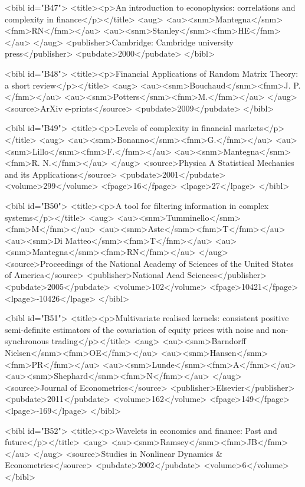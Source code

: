 \documentclass{article}
\begin{document}
{<bibl id="B47">
  <title><p>An introduction to econophysics: correlations and complexity in
  finance</p></title>
  <aug>
    <au><snm>Mantegna</snm><fnm>RN</fnm></au>
    <au><snm>Stanley</snm><fnm>HE</fnm></au>
  </aug>
  <publisher>Cambridge: Cambridge university press</publisher>
  <pubdate>2000</pubdate>
</bibl>

<bibl id="B48">
  <title><p>{Financial Applications of Random Matrix Theory: a short
  review}</p></title>
  <aug>
    <au><snm>{Bouchaud}</snm><fnm>J. P.</fnm></au>
    <au><snm>{Potters}</snm><fnm>M.</fnm></au>
  </aug>
  <source>ArXiv e-prints</source>
  <pubdate>2009</pubdate>
</bibl>

<bibl id="B49">
  <title><p>{Levels of complexity in financial markets}</p></title>
  <aug>
    <au><snm>{Bonanno}</snm><fnm>G.</fnm></au>
    <au><snm>{Lillo}</snm><fnm>F.</fnm></au>
    <au><snm>{Mantegna}</snm><fnm>R. N.</fnm></au>
  </aug>
  <source>Physica A Statistical Mechanics and its Applications</source>
  <pubdate>2001</pubdate>
  <volume>299</volume>
  <fpage>16</fpage>
  <lpage>27</lpage>
</bibl>

<bibl id="B50">
  <title><p>A tool for filtering information in complex systems</p></title>
  <aug>
    <au><snm>Tumminello</snm><fnm>M</fnm></au>
    <au><snm>Aste</snm><fnm>T</fnm></au>
    <au><snm>Di Matteo</snm><fnm>T</fnm></au>
    <au><snm>Mantegna</snm><fnm>RN</fnm></au>
  </aug>
  <source>Proceedings of the National Academy of Sciences of the United States
  of America</source>
  <publisher>National Acad Sciences</publisher>
  <pubdate>2005</pubdate>
  <volume>102</volume>
  <fpage>10421</fpage>
  <lpage>-10426</lpage>
</bibl>

<bibl id="B51">
  <title><p>Multivariate realised kernels: consistent positive semi-definite
  estimators of the covariation of equity prices with noise and non-synchronous
  trading</p></title>
  <aug>
    <au><snm>Barndorff Nielsen</snm><fnm>OE</fnm></au>
    <au><snm>Hansen</snm><fnm>PR</fnm></au>
    <au><snm>Lunde</snm><fnm>A</fnm></au>
    <au><snm>Shephard</snm><fnm>N</fnm></au>
  </aug>
  <source>Journal of Econometrics</source>
  <publisher>Elsevier</publisher>
  <pubdate>2011</pubdate>
  <volume>162</volume>
  <fpage>149</fpage>
  <lpage>-169</lpage>
</bibl>

<bibl id="B52">
  <title><p>Wavelets in economics and finance: Past and future</p></title>
  <aug>
    <au><snm>Ramsey</snm><fnm>JB</fnm></au>
  </aug>
  <source>Studies in Nonlinear Dynamics \& Econometrics</source>
  <pubdate>2002</pubdate>
  <volume>6</volume>
</bibl>

}
\end{document}
